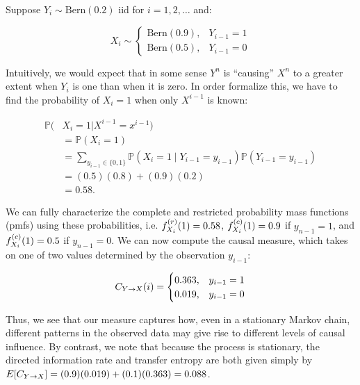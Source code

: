 \begin{example}\label{example}
Suppose $Y_i \sim \text{Bern}(0.2)$ iid for $i=1,2,\dots$ and:

\begin{equation}
X_i \sim
\begin{cases}
      \text{Bern}(0.9), & Y_{i-1} = 1 \\
      \text{Bern}(0.5), & Y_{i-1} = 0
\end{cases}
\end{equation}

\noindent Intuitively, we would expect that in some sense $Y^n$ is ``causing'' $X^n$ to a greater extent when $Y_i$ is one than when it is zero. In order formalize this, we have to find the probability of $X_i=1$ when only $X^{i-1}$ is known:

\begin{equation*}
\begin{aligned}
\mathbb{P}(&X_i = 1 | X^{i-1}=x^{i-1}) \\
&= \mathbb{P}(X_i = 1) \\
&= \sum_{y_{i-1}\in \{0,1\}}
    \mathbb{P}(X_i =1 \mid Y_{i-1} = y_{i-1}) \mathbb{P}(Y_{i-1} = y_{i-1}) \\
&= (0.5)(0.8) + (0.9)(0.2) \\
&= 0.58.
\end{aligned}
\end{equation*}

\noindent We can fully characterize the complete and restricted probability mass functions (pmfs) using these probabilities, i.e. $f_{X_i}^{(r)}(1) = 0.58$, $f_{X_i}^{(c)}(1) = 0.9$ if $y_{n-1}=1$, and $f_{X_i}^{(c)}(1) = 0.5$ if $y_{n-1}=0$. We can now compute the causal measure, which takes on one of two values determined by the observation $y_{i-1}$:

\begin{equation}
C_{Y\rightarrow X}(i) =
\begin{cases}
      0.363, & y_{i-1} = 1 \\
      0.019, & y_{i-1} = 0
\end{cases}
\end{equation}

\noindent Thus, we see that our measure captures how, even in a stationary Markov chain, different patterns in the observed data may give rise to different levels of causal influence. By contrast, we note that because the process is stationary, the directed information rate and transfer entropy are both given simply by $E[C_{Y\rightarrow X}]=(0.9)(0.019)+(0.1)(0.363)=0.088$.
\end{example}

